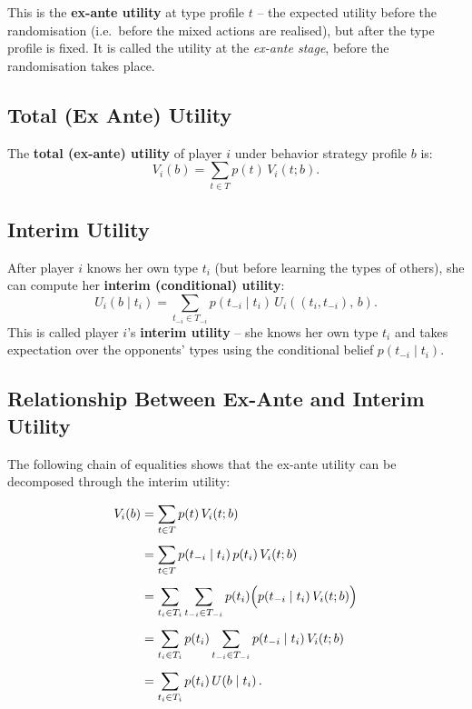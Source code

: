 \documentclass[12pt, a4paper]{article}
\begin{document}
\begin{notebox}
This is the \textbf{ex-ante utility} at type profile $t$ -- the expected utility before the randomisation (i.e.\ before the mixed actions are realised), but after the type profile is fixed. It is called the utility at the \emph{ex-ante stage}, before the randomisation takes place.
\end{notebox}

\subsection{Total (Ex Ante) Utility}

The \textbf{total (ex-ante) utility} of player $i$ under behavior strategy profile $b$ is:
\[
  V_i(b) = \sum_{t \in T} p(t)\, V_i(t; b).
\]

\subsection{Interim Utility}

After player $i$ knows her own type $t_i$ (but before learning the types of others), she can compute her \textbf{interim (conditional) utility}:
\[
  U_i(b \mid t_i) = \sum_{t_{-i} \in T_{-i}} p(t_{-i} \mid t_i)\, U_i\!\left((t_i, t_{-i}),\, b\right).
\]
This is called player $i$'s \textbf{interim utility} -- she knows her own type $t_i$ and takes expectation over the opponents' types using the conditional belief $p(t_{-i} \mid t_i)$.

\subsection{Relationship Between Ex-Ante and Interim Utility}

The following chain of equalities shows that the ex-ante utility can be decomposed through the interim utility:

\begin{align*}
  V_i(b)
  &= \sum_{t \in T} p(t)\, V_i(t; b) \\[4pt]
  &= \sum_{t \in T} p(t_{-i} \mid t_i)\, p(t_i)\, V_i(t; b) \\[4pt]
  &= \sum_{t_i \in T_i} \sum_{t_{-i} \in T_{-i}} p(t_i) \Bigl( p(t_{-i} \mid t_i)\, V_i(t; b) \Bigr) \\[4pt]
  &= \sum_{t_i \in T_i} p(t_i) \sum_{t_{-i} \in T_{-i}} p(t_{-i} \mid t_i)\, V_i(t; b) \\[4pt]
  &= \sum_{t_i \in T_i} p(t_i)\, U\!\left(b \mid t_i\right).
\end{align*}
\end{document}
